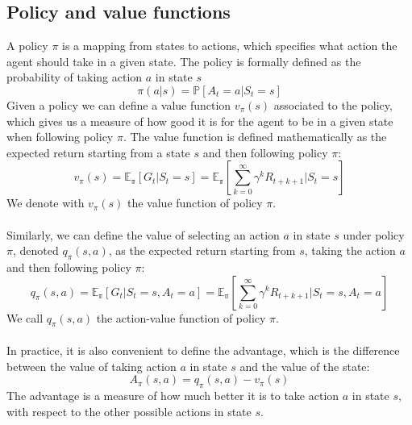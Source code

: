 \subsection{Policy and value functions}
A policy $\pi$ is a mapping from states to actions, which specifies what action the agent should take in a given state. The policy is formally defined as the probability of taking action $a$ in state $s$
\begin{equation}
    \pi(a | s) = \mathds{P}[A_t = a | S_t = s]
    \label{policy}
\end{equation}
Given a policy we can define a value function $v_{\pi}(s)$ associated to the policy, which gives us a measure of how good it is for the agent to be in a given state when following policy $\pi$. The value function is defined mathematically as the expected return starting from a state $s$ and then following policy $\pi$:
\begin{equation}
    v_{\pi}(s) = \mathds{E_{\pi}}[G_t | S_t = s] = \mathds{E_{\pi}}[\sum_{k=0}^{\infty} \gamma^k R_{t+k+1} | S_t = s]
    \label{value-function}
\end{equation}
We denote with $v_{\pi}(s)$ the value function of policy $\pi$.\\\\
Similarly, we can define the value of selecting an action $a$ in state $s$ under policy $\pi$, denoted $q_{\pi}(s, a)$, as the expected return starting from $s$, taking the action $a$ and then following policy $\pi$:
\begin{equation}
    q_{\pi}(s, a) = \mathds{E_{\pi}}[G_t | S_t = s, A_t = a] = \mathds{E_{\pi}}[\sum_{k=0}^{\infty} \gamma^k R_{t+k+1} | S_t = s, A_t = a]
    \label{action-value-function}
\end{equation}
We call $q_{\pi}(s, a)$ the action-value function of policy $\pi$.\\\\
In practice, it is also convenient to define the advantage, which is the difference between the value of taking action $a$ in state $s$ and the value of the state:
\begin{equation}
    A_{\pi}(s, a) = q_{\pi}(s, a) - v_{\pi}(s)
    \label{advantage}
\end{equation}
The advantage is a measure of how much better it is to take action $a$ in state $s$, with respect to the other possible actions in state $s$.\\

